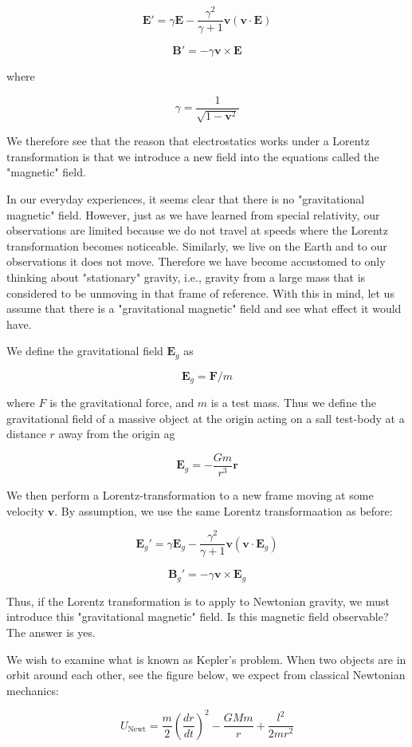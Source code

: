 \documentclass {article}
\renewcommand\vec{\mathbf}
\begin{document}
$$\vec E' = \gamma \vec E - \frac {\gamma^2} {\gamma + 1} \vec v (\vec v \cdot \vec E) $$

$$ \vec B' = - \gamma \vec v \times \vec E$$

where 

$$ \gamma = \frac 1 {\sqrt{1 - \vec v^ 2} } $$ 

We therefore see that the reason that electrostatics works under a Lorentz transformation is that we introduce a new field into the equations called the "magnetic" field.

In our everyday experiences, it seems clear that there is no "gravitational magnetic" field. However, just as we have learned from special relativity, our observations are limited because we do not travel at speeds where the Lorentz transformation becomes noticeable. Similarly, we live on the Earth and to our observations it does not move. Therefore we have become accustomed to only thinking about "stationary" gravity, i.e., gravity from a large mass that is considered to be unmoving in that frame of reference. With this in mind, let us assume that there is a "gravitational magnetic" field and see what effect it would have.

We define the gravitational field $\vec E_g $ as

$$ \vec E_g = \vec F / m $$

where $F$ is the gravitational force, and $m$ is a test mass. Thus we define the gravitational field of a massive object at the origin acting on a sall test-body at a distance $r$ away from the origin ag

$$\vec E_g = - \frac {Gm} {r^3} \vec r $$

We then perform a Lorentz-transformation to a new frame moving at some velocity $\vec v$. By assumption, we use the same Lorentz transformaation as before:

$$\vec E_g' = \gamma \vec E_g - \frac {\gamma^2} {\gamma + 1} \vec v (\vec v \cdot \vec E_g) $$

$$ \vec B_g' = - \gamma \vec v \times \vec E_g$$

Thus, if the Lorentz transformation is to apply to Newtonian gravity, we must introduce this "gravitational magnetic" field. Is this magnetic field observable? The answer is yes.

We wish to examine what is known as  Kepler's problem. When two objects are in orbit around each other, see the figure below, we expect from classical Newtonian mechanics:

$$ U_{\text{Newt}} = \frac m 2 (\frac {dr} {dt})^2 - \frac {GMm} r + \frac {l^2} {2mr^2}$$
\end{document}
